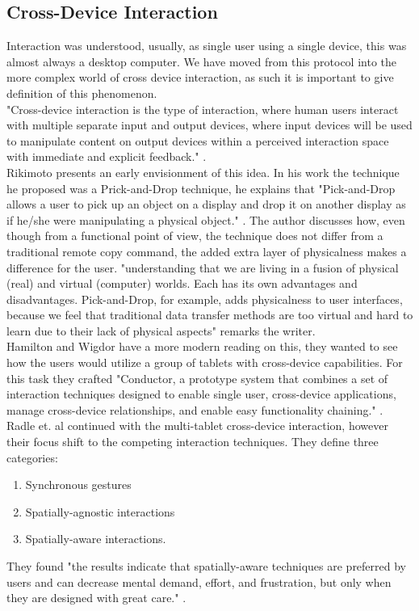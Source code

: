 \subsection{Cross-Device Interaction}

Interaction was understood, usually, as single user using a single device, this was almost always a desktop computer\cite{Levin:2014}. We have moved from this protocol into the more complex world of cross device interaction, as such it is important to give definition of this phenomenon.\\

"Cross-device interaction is the type of interaction, where human users interact with multiple separate input and output devices, where input devices will be used to manipulate content on output devices within a perceived interaction space with immediate and explicit feedback." \cite{Scharf:2013}.\\

Rikimoto presents an early envisionment of this idea. In his work the technique he proposed was a Prick-and-Drop technique, he explains that "Pick-and-Drop allows a user to pick up an object on a display and drop it on another display as if he/she were manipulating a physical object." \cite{Rekimoto:1997}. The author discusses how, even though from a functional point of view, the technique does not differ from a traditional remote copy command, the added extra layer of physicalness makes a difference for the user. "understanding that we are living in a fusion of physical (real) and virtual (computer) worlds. Each has its own advantages and disadvantages. Pick-and-Drop, for example, adds physicalness to user interfaces, because we feel that traditional data transfer methods are too virtual and hard to learn due to their lack of physical aspects" \cite{Rekimoto:1997} remarks the writer.\\

Hamilton and Wigdor have a more modern reading on this, they wanted to see how the users would utilize a group of tablets with cross-device capabilities. For this task they crafted "Conductor, a prototype system that combines a set of interaction techniques designed to enable single user, cross-device applications, manage cross-device relationships, and enable easy functionality chaining." \cite{Hamilton:2014}.\\

Radle et. al continued with the multi-tablet cross-device interaction, however their focus shift to the competing interaction techniques. They define three categories: \begin{enumerate}
	\item Synchronous gestures
	\item Spatially-agnostic interactions
	\item Spatially-aware interactions. 
\end{enumerate} They found "the results indicate that spatially-aware techniques are preferred by users and can decrease mental demand, effort, and frustration, but only when they are designed with great care." \cite{Radle:2015}.\\

